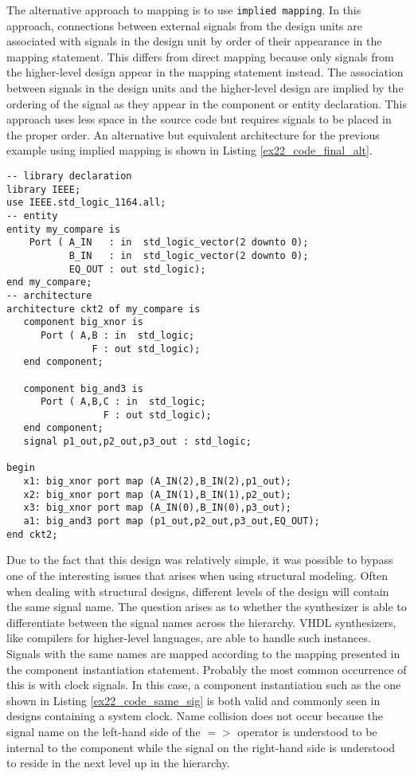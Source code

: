 The alternative approach to mapping is to use \texttt{implied mapping}. In this approach, connections between external signals from the design units are associated with signals in the design unit by order of their appearance in the mapping statement. This differs from direct mapping because only signals from the higher-level design appear in the mapping statement instead. The association between signals in the design units and the higher-level design are implied by the ordering of the signal as they appear in the component or entity declaration. This approach uses less space in the source code but requires signals to be placed in the proper order. An alternative but equivalent architecture for the previous example using implied mapping is shown in Listing \ref{ex22_code_final_alt}. 

\noindent
\begin{minipage}{0.99\linewidth}
\begin{lstlisting}[label=ex22_code_final_alt, caption=Alternative architecture for Example 22 using implied mapping.]
-- library declaration
library IEEE;
use IEEE.std_logic_1164.all;
-- entity
entity my_compare is
    Port ( A_IN   : in  std_logic_vector(2 downto 0);
           B_IN   : in  std_logic_vector(2 downto 0);
           EQ_OUT : out std_logic);
end my_compare;
-- architecture
architecture ckt2 of my_compare is 
   component big_xnor is
      Port ( A,B : in  std_logic;
               F : out std_logic);
   end component;

   component big_and3 is
      Port ( A,B,C : in  std_logic;
                 F : out std_logic);
   end component;
   signal p1_out,p2_out,p3_out : std_logic; 

begin
   x1: big_xnor port map (A_IN(2),B_IN(2),p1_out); 
   x2: big_xnor port map (A_IN(1),B_IN(1),p2_out); 
   x3: big_xnor port map (A_IN(0),B_IN(0),p3_out);   
   a1: big_and3 port map (p1_out,p2_out,p3_out,EQ_OUT); 
end ckt2;
\end{lstlisting}
\end{minipage}

Due to the fact that this design was relatively simple, it was possible to bypass one of the interesting issues that arises when using structural modeling. Often when dealing with structural designs, different levels of the design will contain the same signal name. The question arises as to whether the synthesizer is able to differentiate between the signal names across the hierarchy. VHDL synthesizers, like compilers for higher-level languages, are able to handle such instances. Signals with the same names are mapped according to the mapping presented in the component instantiation statement. Probably the most common occurrence of this is with clock signals. In this case, a component instantiation such as the one shown in Listing \ref{ex22_code_same_sig} is both valid and commonly seen in designs containing a system clock. Name collision does not occur because the signal name on the left-hand side of the $=>$ operator is understood to be internal to the component while the signal on the right-hand side is understood to reside in the next level up in the hierarchy.

